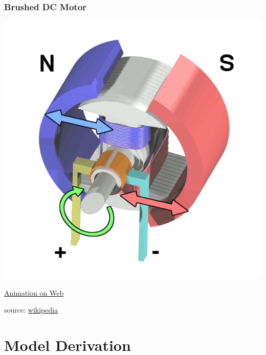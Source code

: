 \documentclass{beamer}                  %
\newcommand{\sectiontitleI}{Brushed DC Motor}
\newcommand{\sectiontitleII}{Model Derivation}
\begin{document}
	\begin{frame}[label=sectionI] \small
		\frametitle{\sectiontitleI}

		\includegraphics[scale=.25]{Electric_motor_cycle_2.png}

		\href{https://en.wikipedia.org/wiki/DC_motor}{Animation on Web} 

		\btVFill
		\tiny{source: \href{https://en.wikipedia.org/wiki/DC_motor}{wikipedia}}
	\end{frame}	

    \section{\sectiontitleII}
\end{document}
